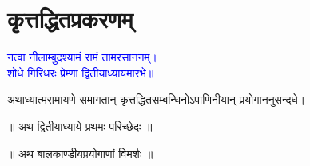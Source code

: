 %
%
%

\renewcommand\chaptername{अथ द्वितीयोऽध्यायः}
\chapter[\texorpdfstring{कृत्तद्धितप्रकरणम्}{द्वितीयोऽध्यायः}]{कृत्तद्धितप्रकरणम्}
\vspace{-5mm}
\fontsize{16}{24}\selectfont\centering\textcolor{blue}{नत्वा नीलाम्बुदश्यामं रामं तामरसाननम्।\nopagebreak\\
शोधे गिरिधरः प्रेम्णा द्वितीयाध्यायमारभे॥}\nopagebreak\\
\vspace{4mm}
\fontsize{14}{21}\selectfont\begin{sloppypar}\justifying\noindent\hspace{10mm} अथाध्यात्म\-रामायणे समागतान् कृत्तद्धित\-सम्बन्धिनोऽपाणिनीयान् प्रयोगाननु\-सन्दधे।\end{sloppypar}
\vspace{4mm}
{}
\centering ॥ अथ द्वितीयाध्याये प्रथमः परिच्छेदः ॥\nopagebreak\\
\vspace{4mm}
{}
\centering ॥ अथ बालकाण्डीयप्रयोगाणां विमर्शः ॥\nopagebreak\\
